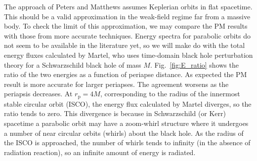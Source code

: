 \documentclass[aps,prd,amsfonts,amssymb,amsmath,reprint,showpacs,groupedaddress]{revtex4-1}
\newcommand{\Figref}[1]{Fig.\ \ref{fig:#1}}
\newcommand{\sub}[1]{\ensuremath{_\text{#1}}}
\begin{document}
The approach of Peters and Matthews assumes Keplerian orbits in flat spacetime. This should be a valid approximation in the weak-field regime far from a massive body. To check the limit of this approximation, we may compare the PM results with those from more accurate techniques. Energy spectra for parabolic orbits do not seem to be available in the literature yet, so we will make do with the total energy fluxes calculated by Martel\cite{Martel2004a}, who uses time-domain black hole perturbation theory for a Schwarzschild black hole of mass $M$. \Figref{E_ratio} shows the ratio of the two energies as a function of periapse distance. As expected the PM result is more accurate for larger periapses. The agreement worsens as the periapsis decreases. At $r\sub{p} = 4 M$, corresponding to the radius of the innermost stable circular orbit (ISCO), the energy flux calculated by Martel diverges, so the ratio tends to zero. This divergence is because in Schwarzschild (or Kerr) spacetime a parabolic orbit may have a zoom-whirl structure where it undergoes a number of near circular orbits (whirls) about the black hole. As the radius of the ISCO is approached, the number of whirls tends to infinity (in the absence of radiation reaction), so an infinite amount of energy is radiated.
\end{document}
